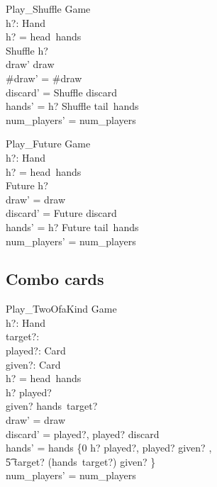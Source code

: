 \documentclass[11pt, fuzz]{article}
\begin{document}
\begin{schema}{Play\_Shuffle}
    \Delta Game \\
    h?: Hand \\
\where
    h? = head~hands \\
    Shuffle \inbag h? \\
    draw' \neq draw \\
    \#draw' = \#draw \\
    discard' = \langle Shuffle \rangle \cat discard \\
    hands' = \langle h? \uminus \lbag Shuffle \rbag \rangle \cat tail~hands \\
    num\_players' = num\_players
\end{schema}

\begin{schema}{Play\_Future}
    \Delta Game \\
    h?: Hand \\
\where
    h? = head~hands \\
    Future \inbag h? \\
    draw' = draw \\
    discard' = \langle Future \rangle \cat discard \\
    hands' = \langle h? \uminus \lbag Future \rbag \rangle \cat tail~hands \\
    num\_players' = num\_players
\end{schema}

\subsection{Combo cards}

\begin{schema}{Play\_TwoOfaKind}
    \Delta Game \\
    h?: Hand \\
    target?: \nat \\
    played?: Card \\
    given?: Card \\
\where
    h? = head~hands \\
    h? \bcount played?  \\
    given? \inbag hands~target? \\
    draw' = draw \\
    discard' = \langle played?, played? \rangle \cat discard \\
    hands' = hands \oplus \{0 \mapsto h? \uminus \lbag played?, played? \rbag \uplus \lbag given? \rbag, \\ \t5 target? \mapsto (hands~target?) \uminus \lbag given? \rbag \} \\
    num\_players' = num\_players
\end{schema}
\end{document}
